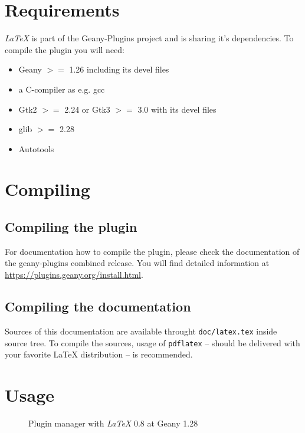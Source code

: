 \documentclass[%
paper=a4,%
fontsize=11pt,%
twoside=false,%
DIV18,%
headsepline,%
plainheadsepline,%
footsepline,%
plainfootsepline,%
bibliography=totoc,%
listof=totoc,%
BCOR10mm,%
parskip=half,%
openany,%
]{scrartcl}
\begin{document}
\newpage{}

\section{Requirements}

\textit{LaTeX} is part of the Geany-Plugins project and is sharing it's
dependencies. To compile the plugin you will need:
\begin{itemize}
	\item Geany $>=$ 1.26 including its devel files
	\item a C-compiler as e.g. gcc
	\item Gtk2 $>=$ 2.24 or Gtk3 $>=$ 3.0 with its devel files
	\item glib $>=$ 2.28
	\item Autotools
\end{itemize}

\section{Compiling}
\subsection{Compiling the plugin}
For documentation how to compile the plugin, please check the
documentation of the geany-plugins combined release. You will find detailed information at \url{https://plugins.geany.org/install.html}.

\subsection{Compiling the documentation}
\label{sec:compiling_of_documentation}
Sources of this documentation are available throught
\texttt{doc/latex.tex} inside source tree. To compile the sources,
usage of \texttt{pdflatex} -- should be delivered with your favorite
\LaTeX{} distribution -- is recommended.

\section{Usage}
\begin{figure}[h!]
	\caption{Plugin manager with \textit{LaTeX} 0.8 at Geany 1.28}
	\label{img:geany_plugin_manager}
\end{figure}
\end{document}
